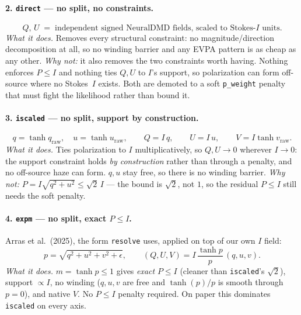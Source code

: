 \documentclass[11pt]{article}
\begin{document}
\paragraph{2. \texttt{direct} --- no split, no constraints.}
\begin{equation}
  Q,\,U \;=\; \text{independent signed NeuralDMD fields, scaled to Stokes-$I$ units}.
\end{equation}
\emph{What it does.} Removes every structural constraint: no magnitude/direction
decomposition at all, so no winding barrier and any EVPA pattern is as cheap as any other.
\emph{Why not:} it also removes the two constraints worth having. Nothing enforces $P\le I$
and nothing ties $Q,U$ to $I$'s support, so polarization can form off-source where no
Stokes~$I$ exists. Both are demoted to a soft \texttt{p\_weight} penalty that must fight
the likelihood rather than bound it.

\paragraph{3. \texttt{iscaled} --- no split, support by construction.}
\begin{equation}
  q = \tanh q_{\mathrm{raw}},\quad u = \tanh u_{\mathrm{raw}},\qquad
  Q = I\,q,\qquad U = I\,u,\qquad V = I\tanh v_{\mathrm{raw}}.
\end{equation}
\emph{What it does.} Ties polarization to $I$ multiplicatively, so $Q,U\to0$ wherever
$I\to0$: the support constraint holds \emph{by construction} rather than through a penalty,
and no off-source haze can form. $q,u$ stay free, so there is no winding barrier.
\emph{Why not:} $P=I\sqrt{q^2+u^2}\le\sqrt2\,I$ --- the bound is $\sqrt2$, not $1$, so the
residual $P\le I$ still needs the soft penalty.

\paragraph{4. \texttt{expm} --- no split, exact $P\le I$.}
Arras et al.\ (2025), the form \texttt{resolve} uses, applied on top of our own $I$ field:
\begin{equation}
  p = \sqrt{q^2+u^2+v^2+\epsilon},\qquad
  (Q,U,V) = I\,\frac{\tanh p}{p}\,(q,u,v).
\end{equation}
\emph{What it does.} $m=\tanh p\le1$ gives \emph{exact} $P\le I$ (cleaner than
\texttt{iscaled}'s $\sqrt2$), support $\propto I$, no winding ($q,u,v$ are free and
$\tanh(p)/p$ is smooth through $p=0$), and native $V$. No $P\le I$ penalty required. On
paper this dominates \texttt{iscaled} on every axis.
\end{document}
